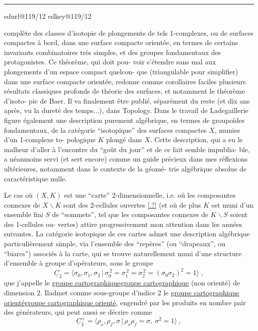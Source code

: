 \documentclass[11pt,a4paper]{article}
\makeatletter
\newif\ifreading
\newif\ifenglish
\def\CurrentScanURL{}
\def\CurrentPageKey{}
\def\CurrentApparatus{}
\newcommand{\scanpage}[1]{%
  \clearpage
  \expandafter\let\expandafter\CurrentScanURL\csname edurl@#1\endcsname
  \expandafter\let\expandafter\CurrentPageKey\csname edkey@#1\endcsname
  \def\CurrentApparatus{}%
  \hypertarget{scan-\CurrentPageKey}{}%
  \typeout{EDITION-SCAN: \CurrentPageKey; PDFPAGE: \the\numexpr\ReadonlyShipoutCounter+1\relax}%
  \ifreading
    \marginnote{\raggedright\scriptsize\sffamily\href{\CurrentScanURL}{119 / \csname edpage@#1\endcsname}}%
  \else
    \noindent{\small\sffamily\href{\CurrentScanURL}{[scan #1]}}\par\smallskip
  \fi}
\newcommand{\mspage}[1]{%
  \ifreading\marginnote{\raggedright\scriptsize\sffamily p.\,#1}[2\baselineskip]%
  \else\noindent{\small\sffamily[p.\,#1]}\par\smallskip\fi}
\let\TextUline\uline
\renewcommand{\uline}[1]{\ifmmode\underline{#1}\else\TextUline{#1}\fi}
\newcommand{\unsure}[1]{\href{\CurrentScanURL}{[#1?]}}
\newcommand{\margin}[1]{%
  \sbox{\MarginalTestBox}{\parbox{\marginparwidth}{\raggedright\footnotesize#1}}%
  \ifdim\dimexpr\ht\MarginalTestBox+\dp\MarginalTestBox\relax>3\baselineskip
    \par\smallskip\noindent\begin{minipage}{\linewidth}\hrule\smallskip
    {\footnotesize\textcolor{HandInk}{\ifenglish Marginal note:\else Note marginale :\fi\ #1}}\smallskip\hrule\end{minipage}\par\smallskip
  \else
    \marginnote{\raggedright\footnotesize\textcolor{HandInk}{#1}}%
  \fi}
\newcommand{\finishscan}{\ifx\CurrentApparatus\empty\else\par\bigskip\noindent\rule{.35\linewidth}{.35pt}\par\smallskip{\footnotesize\setlength{\parskip}{3pt}\CurrentApparatus}\fi}
\makeatother
\begin{document}
\margin{11}

\finishscan
\scanpage{119/12}
\mspage{10}

complète des classes d'isotopie de plongements de tels 1-complexes,
ou de surfaces compactes à bord, dans une surface compacte orientée,
en termes de certains invariants combinatoires très simples, et des
groupes fondamentaux des protagonistes. Ce théorème, qui doit pou-%
voir s'étendre sans mal aux plongements d'un espace compact quelcon-%
que (triangulable pour simplifier) dans une surface compacte orientée,
redonne comme corollaires faciles plusieurs résultats classiques
profonds de théorie des surfaces, et notamment le théorème d'isoto-%
pie de Baer. Il va finalement être publié, séparément du reste (et
dix ans après, vu la dureté des temps...), dans Topology. Dans le
travail de Ladegaillerie figure également une description purement
algébrique, en termes de groupoïdes fondamentaux, de la catégorie
``isotopique'' des surfaces compactes $X$, munies d'un 1-complexe to-%
pologique $K$ plongé dans $X$. Cette description, qui a eu le malheur
d'aller à l'encontre du ``goût du jour'' et de ce fait semble impublia-%
ble, a néanmoins servi (et sert encore) comme un guide précieux dans
mes réflexions ultérieures, notamment dans le contexte de la géomé-%
trie algébrique absolue de caractéristique nulle.

Le cas où $(X,K)$ est une ``carte'' 2-dimensionnelle, i.e.
où les composantes connexes de $X\backslash K$ sont des 2-cellules ouvertes \unsure{.}
(et où de plus $K$ est muni d'un ensemble fini $S$ de ``sommets'',
tel que les composantes connexes de $K\backslash S$ soient des 1-cellules ou-%
vertes) attire progressivement mon attention dans les années suivantes.
La catégorie isotopique de ces cartes admet une description algébrique
particulièrement simple, via l'ensemble des ``repères'' (ou ``drapeaux'',
ou ``biarcs'') associés à la carte, qui se trouve naturellement muni
d'une structure d'ensemble à groupe d'opérateurs, sous le groupe
\[ \underline{C}_2 = \langle \sigma_0,\sigma_1,\sigma_2 \,|\, \sigma_0^{\,2} = \sigma_1^{\,2} = \sigma_2^{\,2} = (\sigma_0\sigma_2)^2 = 1 \rangle \ , \]
que j'appelle le \uline{groupe cartographique} (non orienté) de dimension 2.
Iladmet comme sous-groupe d'indice 2 le \uline{groupe cartographique orienté},
engendré par les produits en nombre pair des générateurs, qui peut
aussi se décrire comme
\[ \underline{C}_2^{+} = \langle \rho_s,\rho_f,\sigma \,|\, \rho_s\rho_f = \sigma,\ \sigma^2 = 1 \rangle \ , \]
\end{document}
